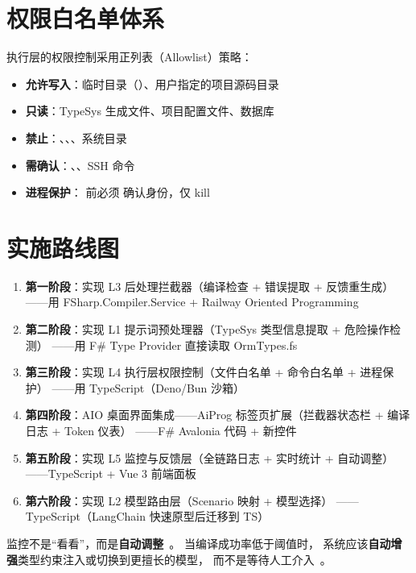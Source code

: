 \documentclass[10pt, openany]{book}
\begin{document}
\section{权限白名单体系}

执行层的权限控制采用正列表（Allowlist）策略：

\begin{itemize}
    \item \textbf{允许写入}：临时目录（）、用户指定的项目源码目录
    \item \textbf{只读}：TypeSys 生成文件、项目配置文件、数据库
    \item \textbf{禁止}：、、、系统目录
    \item \textbf{需确认}：、、SSH 命令
    \item \textbf{进程保护}： 前必须  确认身份，仅 kill 
\end{itemize}

\section{实施路线图}

\begin{enumerate}
    \item \textbf{第一阶段}：实现 L3 后处理拦截器（编译检查 + 错误提取 + 反馈重生成）
        ——用 FSharp.Compiler.Service + Railway Oriented Programming
    \item \textbf{第二阶段}：实现 L1 提示词预处理器（TypeSys 类型信息提取 + 危险操作检测）
        ——用 F\# Type Provider 直接读取 OrmTypes.fs
    \item \textbf{第三阶段}：实现 L4 执行层权限控制（文件白名单 + 命令白名单 + 进程保护）
        ——用 TypeScript（Deno/Bun 沙箱）
    \item \textbf{第四阶段}：AIO 桌面界面集成——AiProg 标签页扩展（拦截器状态栏 + 编译日志 + Token 仪表）
        ——F\# Avalonia 代码 + 新控件
    \item \textbf{第五阶段}：实现 L5 监控与反馈层（全链路日志 + 实时统计 + 自动调整）
        ——TypeScript + Vue 3 前端面板
    \item \textbf{第六阶段}：实现 L2 模型路由层（Scenario 映射 + 模型选择）
        ——TypeScript（LangChain 快速原型后迁移到 TS）
\end{enumerate}

\begin{principle}[资源效率原则]
监控不是``看看''，而是\textbf{自动调整}~\cite{Wu2024AutoGen}。
当编译成功率低于阈值时，
系统应该\textbf{自动增强}类型约束注入或切换到更擅长的模型，
而不是等待人工介入~\cite{Shinn2024Reflexion}。
\end{principle}
\end{document}
